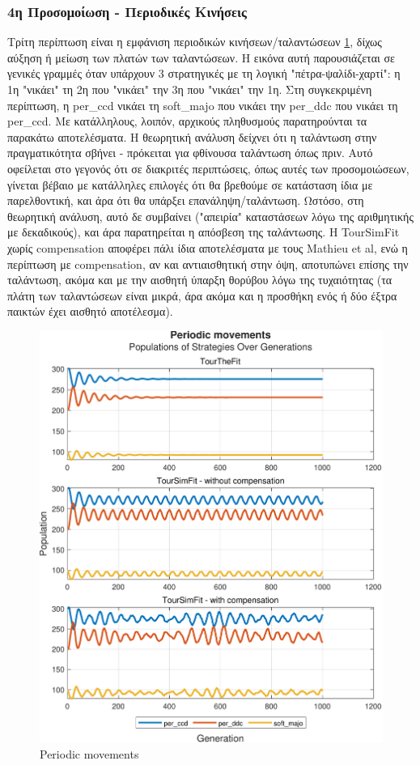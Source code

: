 \documentclass[12pt]{article}
\begin{document}
\subsubsection{4η Προσομοίωση - Περιοδικές Κινήσεις}
Τρίτη περίπτωση είναι η εμφάνιση περιοδικών κινήσεων/ταλαντώσεων \ref{fig:Περιοδικές Κινήσεις}, δίχως αύξηση ή μείωση των πλατών των ταλαντώσεων. Η εικόνα αυτή παρουσιάζεται σε γενικές γραμμές όταν υπάρχουν 3 στρατηγικές με τη λογική "πέτρα-ψαλίδι-χαρτί": η 1η "νικάει" τη 2η που "νικάει" την 3η που "νικάει" την 1η. Στη συγκεκριμένη περίπτωση, η per\_ccd νικάει τη soft\_majo που νικάει την per\_ddc που νικάει τη per\_ccd. Με κατάλληλους, λοιπόν, αρχικούς πληθυσμούς παρατηρούνται τα παρακάτω αποτελέσματα. Η θεωρητική ανάλυση δείχνει ότι η ταλάντωση στην πραγματικότητα σβήνει - πρόκειται για φθίνουσα ταλάντωση όπως πριν. Αυτό οφείλεται στο γεγονός ότι σε διακριτές περιπτώσεις, όπως αυτές των προσομοιώσεων, γίνεται βέβαιο με κατάλληλες επιλογές ότι θα βρεθούμε σε κατάσταση ίδια με παρελθοντική, και άρα ότι θα υπάρξει επανάληψη/ταλάντωση. Ωστόσο, στη θεωρητική ανάλυση, αυτό δε συμβαίνει ("απειρία" καταστάσεων λόγω της αριθμητικής με δεκαδικούς), και άρα παρατηρείται η απόσβεση της ταλάντωσης. Η TourSimFit χωρίς compensation αποφέρει πάλι ίδια αποτελέσματα με τους Mathieu et al, ενώ η περίπτωση με compensation, αν και αντιαισθητική στην όψη, αποτυπώνει επίσης την ταλάντωση, ακόμα και με την αισθητή ύπαρξη θορύβου λόγω της τυχαιότητας (τα πλάτη των ταλαντώσεων είναι μικρά, άρα ακόμα και η προσθήκη ενός ή δύο έξτρα παικτών έχει αισθητό αποτέλεσμα).
	\begin{figure}[h]
	      \centering
	      \includegraphics[scale=0.8]{Periodic movements.pdf}
	      \caption{Periodic movements}
	      \label{fig:Περιοδικές Κινήσεις}
	\end{figure}
\end{document}
